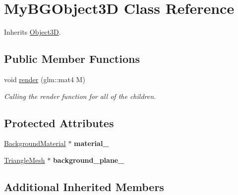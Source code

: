 \hypertarget{class_my_b_g_object3_d}{\section{My\-B\-G\-Object3\-D Class Reference}
\label{class_my_b_g_object3_d}
}


Inherits \hyperlink{class_object3_d}{Object3\-D}.

\subsection*{Public Member Functions}
\begin{DoxyCompactItemize}
\item 
void \hyperlink{class_my_b_g_object3_d_a2e2960ff0476c72fd754bfe615b32946}{render} (glm\-::mat4 M)
\begin{DoxyCompactList}\small\item\em Calling the render function for all of the children. \end{DoxyCompactList}\end{DoxyCompactItemize}
\subsection*{Protected Attributes}
\begin{DoxyCompactItemize}
\item 
\hypertarget{class_my_b_g_object3_d_a694e2b90109426acfa783d5caa9cd4a1}{\hyperlink{class_background_material}{Background\-Material} $\ast$ {\bfseries material\-\_\-}}\label{class_my_b_g_object3_d_a694e2b90109426acfa783d5caa9cd4a1}

\item 
\hypertarget{class_my_b_g_object3_d_aff4af0ecab7877080a16928bc1bd379c}{\hyperlink{class_triangle_mesh}{Triangle\-Mesh} $\ast$ {\bfseries background\-\_\-plane\-\_\-}}\label{class_my_b_g_object3_d_aff4af0ecab7877080a16928bc1bd379c}

\end{DoxyCompactItemize}
\subsection*{Additional Inherited Members}



